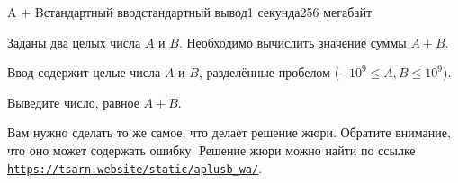 \begin{problem}{A + B}{стандартный ввод}{стандартный вывод}{1 секунда}{256 мегабайт}

\providecommand{\url}[1]{\underline{\texttt{#1}}}

Заданы два целых числа $A$ и $B$. Необходимо вычислить значение суммы $A + B$.

\InputFile
Ввод содержит целые числа $A$ и $B$, разделённые пробелом ($-10^{9} \le A, B \le 10^{9}$).

\OutputFile
Выведите число, равное $A + B$.

\Example

\begin{example}
%
\end{example}

\Note
Вам нужно сделать то же самое, что делает решение жюри. Обратите внимание, что оно может содержать ошибку. Решение жюри можно найти по ссылке \url{https://tsarn.website/static/aplusb\_wa/}.

\end{problem}

